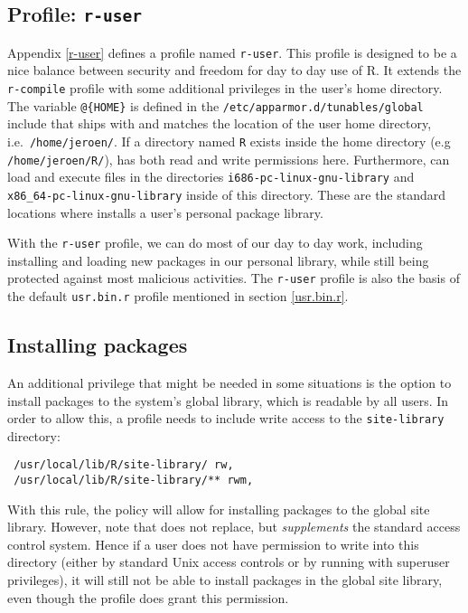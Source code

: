 \subsection{Profile: \texttt{r-user}}

Appendix \ref{r-user} defines a profile named \texttt{r-user}. This profile is
designed to be a nice balance between security and freedom for day to day use
of R. It extends the \texttt{r-compile} profile with some additional privileges
in the user's home directory. The variable \texttt{@\{HOME\}} is defined in the
\texttt{/etc/apparmor.d/tunables/global} include that ships with \AppArmor and
matches the location of the user home directory, i.e.\ \texttt{/home/jeroen/}.
If a directory named \texttt{R} exists inside the home directory 
(e.g \texttt{/home/jeroen/R/}), \R has both read and write permissions here.
Furthermore, \R can load and execute files in the directories
\texttt{i686-pc-linux-gnu-library} and \texttt{x86\_64-pc-linux-gnu-library}
inside of this directory. These are the standard locations where \R installs a
user's personal package library.

With the \texttt{r-user} profile, we can do most of our day to day work,
including installing and loading new packages in our personal library, while
still being protected against most malicious activities. The \texttt{r-user}
profile is also the basis of the default \texttt{usr.bin.r} profile mentioned
in section \ref{usr.bin.r}.

\subsection{Installing packages}

An additional privilege that might be needed in some situations is the option
to install packages to the system's global library, which is readable by all
users. In order to allow this, a profile needs to include write access to the
\texttt{site-library} directory:

\begin{verbatim}
 /usr/local/lib/R/site-library/ rw,
 /usr/local/lib/R/site-library/** rwm,
\end{verbatim}

With this rule, the policy will allow for installing \R packages to the global
site library. However, note that \AppArmor does not replace, but
\emph{supplements} the standard access control system. Hence if a user does not
have permission to write into this directory (either by standard Unix access
controls or by running with superuser privileges), it will still not be able to
install packages in the global site library, even though the \AppArmor profile
does grant this permission.


